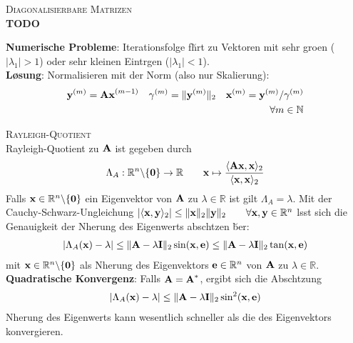 \textsc{Diagonalisierbare Matrizen}\\
\textbf{TODO}\vspace{0.2cm}


\textbf{Numerische Probleme}: Iterationsfolge f\u hrt zu Vektoren mit sehr gro\s en ($|\lambda_1|>1$) oder sehr kleinen Eintr\a gen ($|\lambda_1|<1$).\\
\textbf{L\o sung}: Normalisieren mit der Norm (also nur Skalierung):
\begin{align*}
\mbox{\bf y}^{(m)} = \mbox{\bf Ax}^{(m-1)} \quad \gamma^{(m)}= \Vert \mbox{\bf y}^{(m)} \Vert_2 \quad \mbox{\bf x}^{(m)} = \mbox{\bf y}^{(m)}/\gamma^{(m)} \\ \forall m\in \mathbb{N}
\end{align*}

\textsc{Rayleigh-Quotient}\\
Rayleigh-Quotient zu $\mbox{\bf A}$ ist gegeben durch
\begin{align*}
\Lambda_A: \mathbb{R}^{n} \backslash \{\mbox{\bf 0}\} \rightarrow \mathbb{R} \qquad \mbox{\bf x} \mapsto \frac{\langle \mbox{\bf Ax}, \mbox{\bf x} \rangle_2}{\langle \mbox{\bf x}, \mbox{\bf x} \rangle_2}
\end{align*}
Falls $\mbox{\bf x}\in \mathbb{R}^{n} \backslash \{\mbox{\bf 0}\}$ ein Eigenvektor von $\mbox{\bf A}$ zu $\lambda \in \mathbb{R}$ ist gilt $\Lambda_A = \lambda$. Mit der Cauchy-Schwarz-Ungleichung $|\langle \mbox{\bf x}, \mbox{\bf y} \rangle_2| \leq \Vert\mbox{\bf x} \Vert_2\Vert\mbox{\bf y} \Vert_2 \qquad \forall \mbox{\bf x},\mbox{\bf y} \in \mathbb{R}^{n}$ l\a sst sich die Genauigkeit der N\a herung des Eigenwerts absch\a tzen \u ber:
\begin{align*}
|\Lambda_A(\mbox{\bf x}) - \lambda| \leq \Vert \mbox{\bf A} - \lambda \mbox{\bf I} \Vert_2 \sin(\mbox{\bf x},\mbox{\bf e}) \leq \Vert \mbox{\bf A} -\lambda \mbox{\bf I} \Vert_2 \tan(\mbox{\bf x}, \mbox{\bf e})
\end{align*}
mit $\mbox{\bf x} \in \mathbb{R}^{n} \backslash \{\mbox{\bf 0}\}$ als N\a herung des Eigenvektors $\mbox{\bf e}\in \mathbb{R}^{n}$ von $\mbox{\bf A}$ zu $\lambda \in \mathbb{R}$.\\

\textbf{Quadratische Konvergenz}: Falls $\mbox{\bf A}=\mbox{\bf A}^*$, ergibt sich die Absch\a tzung\begin{align*}
|\Lambda_A(\mbox{\bf x}) - \lambda| \leq \Vert \mbox{\bf A}- \lambda \mbox{\bf I} \Vert_2 \sin^2(\mbox{\bf x},\mbox{\bf e})
\end{align*}
N\a herung des Eigenwerts kann wesentlich schneller  als die des Eigenvektors konvergieren.\vspace{0.2cm}

